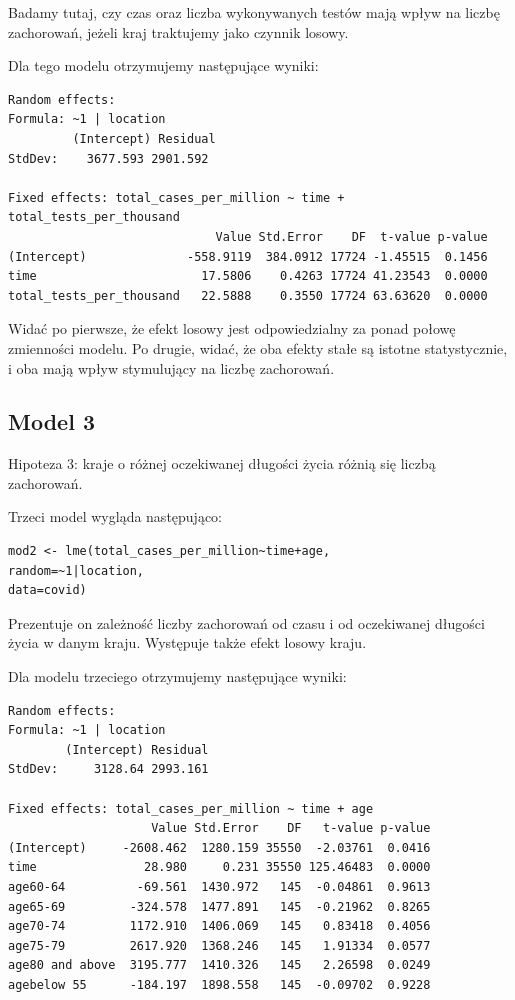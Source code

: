 \documentclass[12pt]{mwbk}
\theoremstyle{plain}
\theoremstyle{definition}
\theoremstyle{remark}
\begin{document}
Badamy tutaj, czy czas oraz liczba wykonywanych testów mają wpływ na liczbę zachorowań, jeżeli kraj traktujemy jako czynnik losowy.

Dla tego modelu otrzymujemy następujące wyniki:

\begin{verbatim}
Random effects:
Formula: ~1 | location
         (Intercept) Residual
StdDev:    3677.593 2901.592

Fixed effects: total_cases_per_million ~ time + total_tests_per_thousand 
                             Value Std.Error    DF  t-value p-value
(Intercept)              -558.9119  384.0912 17724 -1.45515  0.1456
time                       17.5806    0.4263 17724 41.23543  0.0000
total_tests_per_thousand   22.5888    0.3550 17724 63.63620  0.0000
\end{verbatim}

Widać po pierwsze, że efekt losowy jest odpowiedzialny za ponad połowę zmienności modelu. Po drugie, widać, że oba efekty stałe są istotne statystycznie, i oba mają wpływ stymulujący na liczbę zachorowań.

\subsection{Model 3}


Hipoteza 3: kraje o różnej oczekiwanej długości życia różnią się liczbą zachorowań.

Trzeci model wygląda następująco:

\begin{verbatim}
mod2 <- lme(total_cases_per_million~time+age,
random=~1|location,
data=covid)

\end{verbatim}

Prezentuje on zależność liczby zachorowań od czasu i od oczekiwanej długości życia w danym kraju. Występuje także efekt losowy kraju.

Dla modelu trzeciego otrzymujemy następujące wyniki:

\begin{verbatim}
Random effects:
Formula: ~1 | location
        (Intercept) Residual
StdDev:     3128.64 2993.161

Fixed effects: total_cases_per_million ~ time + age 
                    Value Std.Error    DF   t-value p-value
(Intercept)     -2608.462  1280.159 35550  -2.03761  0.0416
time               28.980     0.231 35550 125.46483  0.0000
age60-64          -69.561  1430.972   145  -0.04861  0.9613
age65-69         -324.578  1477.891   145  -0.21962  0.8265
age70-74         1172.910  1406.069   145   0.83418  0.4056
age75-79         2617.920  1368.246   145   1.91334  0.0577
age80 and above  3195.777  1410.326   145   2.26598  0.0249
agebelow 55      -184.197  1898.558   145  -0.09702  0.9228
\end{verbatim}
\end{document}
